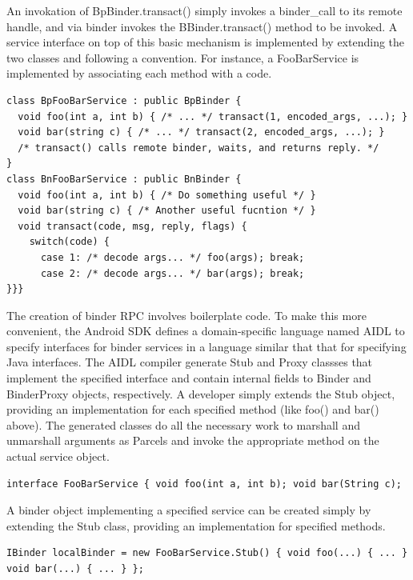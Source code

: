 \documentclass[prodmode]{acmlarge}
\begin{document}
An invokation of BpBinder.transact() simply invokes a binder\_call to its remote handle, and via binder invokes the BBinder.transact() method to be invoked. A service interface on top of this basic mechanism is implemented by extending the two classes and following a convention. For instance, a FooBarService is implemented by associating each method with a code.

\begin{Verbatim}[samepage=true]
class BpFooBarService : public BpBinder {
  void foo(int a, int b) { /* ... */ transact(1, encoded_args, ...); }
  void bar(string c) { /* ... */ transact(2, encoded_args, ...); }
  /* transact() calls remote binder, waits, and returns reply. */
}
class BnFooBarService : public BnBinder {
  void foo(int a, int b) { /* Do something useful */ }
  void bar(string c) { /* Another useful fucntion */ }
  void transact(code, msg, reply, flags) {
    switch(code) {
      case 1: /* decode args... */ foo(args); break;
      case 2: /* decode args... */ bar(args); break;
}}}
\end{Verbatim}


The creation of binder RPC involves boilerplate code. To make this more convenient, the Android SDK defines a domain-specific language named AIDL to specify interfaces for binder services in a language similar that that for specifying Java interfaces. The AIDL compiler generate Stub and Proxy classses that implement the specified interface and contain internal fields to Binder and BinderProxy objects, respectively. A developer simply extends the Stub object, providing an implementation for each specified method (like foo() and bar() above). The generated classes do all the necessary work to marshall and unmarshall arguments as Parcels and invoke the appropriate method on the actual service object.

\begin{Verbatim}[samepage=true]
interface FooBarService { void foo(int a, int b); void bar(String c); 
\end{Verbatim}

A binder object implementing a specified service can be created simply by extending the Stub class, providing an implementation for specified methods.
\begin{Verbatim}[samepage=true]
IBinder localBinder = new FooBarService.Stub() { void foo(...) { ... } void bar(...) { ... } };
\end{Verbatim}
\end{document}
